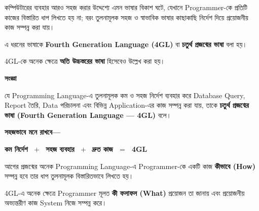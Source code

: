 
কম্পিউটারের ব্যবহার আরও সহজ করার উদ্দেশ্যে এমন ভাষার বিকাশ ঘটে,
যেখানে Programmer-কে প্রতিটি কাজের বিস্তারিত ধাপ লিখতে হয় না;
বরং তুলনামূলক সহজ ও স্বাভাবিক ভাষার কাছাকাছি নির্দেশ দিয়ে
প্রয়োজনীয় কাজ সম্পন্ন করা যায়।

এ ধরনের ভাষাকে
\textbf{Fourth Generation Language (4GL)}
বা \textbf{চতুর্থ প্রজন্মের ভাষা} বলা হয়।

4GL-কে অনেক ক্ষেত্রে \textbf{অতি উচ্চস্তরের ভাষা}
হিসেবেও উল্লেখ করা হয়।


\begin{definitionbox}

\textbf{\color{darkTeal}সংজ্ঞা}

যে Programming Language-এ তুলনামূলক কম ও সহজ নির্দেশ ব্যবহার করে
Database Query, Report তৈরি, Data পরিচালনা এবং বিভিন্ন Application-এর
কাজ সম্পন্ন করা যায়, তাকে
\textbf{চতুর্থ প্রজন্মের ভাষা
(Fourth Generation Language — 4GL)} বলে।

\end{definitionbox}

\textbf{সহজভাবে মনে রাখবে—}

\begin{center}

\textbf{
কম নির্দেশ
\(\;+\;\)
সহজ ব্যবহার
\(\;+\;\)
দ্রুত কাজ
\(\;=\;\)
4GL
}

\end{center}


আগের প্রজন্মের অনেক Programming Language-এ Programmer-কে
একটি কাজ \textbf{কীভাবে (How)} সম্পন্ন হবে তার ধাপ
তুলনামূলক বিস্তারিতভাবে লিখতে হয়।

4GL-এ অনেক ক্ষেত্রে Programmer মূলত
\textbf{কী ফলাফল (What)} প্রয়োজন তা জানায় এবং প্রয়োজনীয়
অভ্যন্তরীণ কাজ System নিজে সম্পন্ন করে।

\begin{center}

\hspace{7mm}

\end{center}


